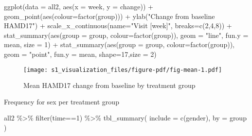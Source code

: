 \documentclass[
  letterpaper,
  DIV=11,
  numbers=noendperiod]{scrreprt}
\newenvironment{Shaded}{\begin{snugshade}}{\end{snugshade}}
\newcommand{\AttributeTok}[1]{\textcolor[rgb]{0.40,0.45,0.13}{#1}}
\newcommand{\DecValTok}[1]{\textcolor[rgb]{0.68,0.00,0.00}{#1}}
\newcommand{\FunctionTok}[1]{\textcolor[rgb]{0.28,0.35,0.67}{#1}}
\newcommand{\NormalTok}[1]{\textcolor[rgb]{0.00,0.23,0.31}{#1}}
\newcommand{\SpecialCharTok}[1]{\textcolor[rgb]{0.37,0.37,0.37}{#1}}
\newcommand{\StringTok}[1]{\textcolor[rgb]{0.13,0.47,0.30}{#1}}
\begin{document}
\begin{Shaded}
\begin{Highlighting}[]
\FunctionTok{ggplot}\NormalTok{(}\AttributeTok{data =}\NormalTok{ all2, }\FunctionTok{aes}\NormalTok{(}\AttributeTok{x =}\NormalTok{ week, }\AttributeTok{y =}\NormalTok{ change)) }\SpecialCharTok{+}  
  \FunctionTok{geom\_point}\NormalTok{(}\FunctionTok{aes}\NormalTok{(}\AttributeTok{colour=}\FunctionTok{factor}\NormalTok{(group))) }\SpecialCharTok{+} \FunctionTok{ylab}\NormalTok{(}\StringTok{"Change from baseline HAMD17"}\NormalTok{) }\SpecialCharTok{+}
  \FunctionTok{scale\_x\_continuous}\NormalTok{(}\AttributeTok{name=}\StringTok{"Visit [week]"}\NormalTok{, }\AttributeTok{breaks=}\FunctionTok{c}\NormalTok{(}\DecValTok{2}\NormalTok{,}\DecValTok{4}\NormalTok{,}\DecValTok{8}\NormalTok{)) }\SpecialCharTok{+}
  \FunctionTok{stat\_summary}\NormalTok{(}\FunctionTok{aes}\NormalTok{(}\AttributeTok{group =}\NormalTok{ group, }\AttributeTok{colour=}\FunctionTok{factor}\NormalTok{(group)), }\AttributeTok{geom =} \StringTok{"line"}\NormalTok{, }\AttributeTok{fun.y =}\NormalTok{ mean,}
               \AttributeTok{size =} \DecValTok{1}\NormalTok{) }\SpecialCharTok{+}
  \FunctionTok{stat\_summary}\NormalTok{(}\FunctionTok{aes}\NormalTok{(}\AttributeTok{group =}\NormalTok{ group, }\AttributeTok{colour=}\FunctionTok{factor}\NormalTok{(group)), }\AttributeTok{geom =} \StringTok{"point"}\NormalTok{, }\AttributeTok{fun.y =}\NormalTok{ mean,}
               \AttributeTok{shape=}\DecValTok{17}\NormalTok{,}\AttributeTok{size =} \DecValTok{2}\NormalTok{)}
\end{Highlighting}
\end{Shaded}

\begin{figure}[H]

{\centering \texttt{[image: s1\_visualization\_files/figure-pdf/fig-mean-1.pdf]}

}

\caption{\label{fig-mean}Mean HAMD17 change from baseline by treatment
group}

\end{figure}

Frequency for sex per treatment group

\begin{Shaded}
\begin{Highlighting}[]
\NormalTok{all2 }\SpecialCharTok{\%\textgreater{}\%} \FunctionTok{filter}\NormalTok{(time}\SpecialCharTok{==}\DecValTok{1}\NormalTok{) }\SpecialCharTok{\%\textgreater{}\%}
  \FunctionTok{tbl\_summary}\NormalTok{(}
    \AttributeTok{include =} \FunctionTok{c}\NormalTok{(gender),}
    \AttributeTok{by =}\NormalTok{ group}
\NormalTok{  )}
\end{Highlighting}
\end{Shaded}
\end{document}
